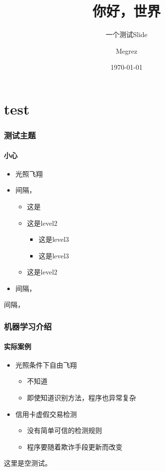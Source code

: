 \documentclass[t,12pt]{beamer}
\begin{document}
\title{你好，世界}
\subtitle{\longdash 一个测试Slide}
\author[del2z]{Megrez}
\date{\today}

\begin{frame}
\titlepage
\end{frame}

\section{test}
\begin{frame}
\frametitle{测试主题}
\framesubtitle{小心}

\begin{itemize}
  \item<1-> 光照飞翔 \\
  \item<2-> 间隔\the\itemsep，\\
  \begin{itemize}
    \item 这是\the\itemsep
    \item 这是level2 \\
    \begin{itemize}
      \item 这是level3
      \item 这是level3
    \end{itemize}
    \item 这是level2
  \end{itemize}
  \item<2-> 间隔\the\itemsep，
  \end{itemize}
  间隔\the\itemsep，
\end{frame}

\begin{frame}
\frametitle{机器学习介绍}
\framesubtitle{实际案例}

\begin{itemize}
  \item<1-> 光照{条件下自由}飞翔 \\
  \begin{itemize}
    \item 不知道\the\itemsep
    \item 即使知道识别方法，程序也异常复杂
  \end{itemize}
  \item<2-> 信用卡虚假交易检测
  \begin{itemize}
    \item 没有简单可信的检测规则
    \item 程序要随着欺诈手段更新而改变
  \end{itemize}
\end{itemize}
\end{frame}

\begin{frame}
这里是空测试。
\end{frame}

\begin{frame}
\lastpage
\end{frame}
\end{document}
